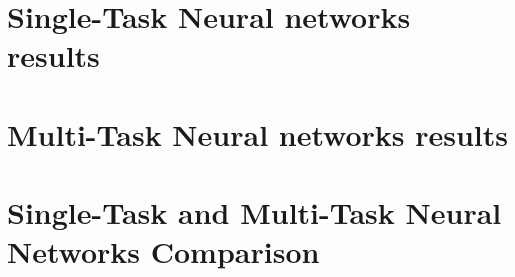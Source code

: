 \section{Single-Task Neural networks results}
\section{Multi-Task Neural networks results}
\section{Single-Task and Multi-Task Neural Networks Comparison}